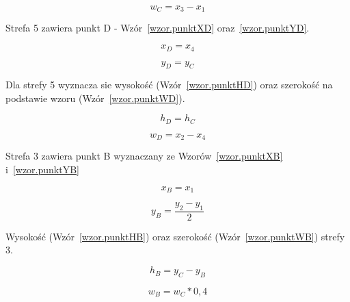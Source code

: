 \documentclass[a4paper,twoside,12pt]{book}
\begin{document}
    \large
    \begin{equation}
        w_{C}= x_{3} - x_{1}
        \label{wzor.punktWC}
    \end{equation}
    \normalsize

    Strefa 5 zawiera punkt D - Wzór~\ref{wzor.punktXD} oraz~\ref{wzor.punktYD}.

    \large
    \begin{equation}
        x_{D}=x_{4}
        \label{wzor.punktXD}
    \end{equation}
    \normalsize

    \large
    \begin{equation}
        y_{D}= y_{C}
        \label{wzor.punktYD}
    \end{equation}
    \normalsize

    Dla strefy 5 wyznacza sie wysokość (Wzór~\ref{wzor.punktHD}) oraz szerokość na podstawie wzoru (Wzór~\ref{wzor.punktWD}).

    \large
    \begin{equation}
        h_{D}=h_{C}
        \label{wzor.punktHD}
    \end{equation}
    \normalsize

    \large
    \begin{equation}
        w_{D}= x_{2} - x_{4}
        \label{wzor.punktWD}
    \end{equation}
    \normalsize

    Strefa 3 zawiera punkt B wyznaczany ze Wzorów~\ref{wzor.punktXB} i~\ref{wzor.punktYB}

    \large
    \begin{equation}
        x_{B}=x_{1}
        \label{wzor.punktXB}
    \end{equation}
    \normalsize

    \large
    \begin{equation}
        y_{B}= \frac{y_{2} - y_{1}}{2}
        \label{wzor.punktYB}
    \end{equation}
    \normalsize

    Wysokość (Wzór~\ref{wzor.punktHB}) oraz szerokość (Wzór~\ref{wzor.punktWB}) strefy 3.

    \large
    \begin{equation}
        h_{B}=y_{C} - y_{B}
        \label{wzor.punktHB}
    \end{equation}
    \normalsize

    \large
    \begin{equation}
        w_{B}= w_{C} * 0,4
        \label{wzor.punktWB}
    \end{equation}
    \normalsize
\end{document}
